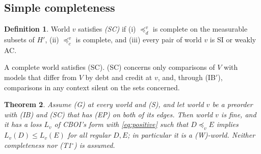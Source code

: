 \documentclass[11pt]{article}
\newtheorem{theorem}{Theorem}
\theoremstyle{definition}\newtheorem{definition}[theorem]{Definition}
\theoremstyle{remark}\newtheorem{remark}[theorem]{Remark}
\newcommand{\To}{\textup{(T1$^\circ$)}}
\begin{document}
\subsection{Simple completeness}\label{sec:SC}

\begin{definition}\label{def:SC}
World $v$ satisfies \emph{(SC)} if (i) $\preceq^v_d$ is complete on the
measurable subsets of $H'$, (ii) $\preceq^v_c$ is complete, and (iii) every
pair of world $v$ is SI or weakly AC.
\end{definition}

A complete world satisfies (SC). (SC) concerns only comparisons of $V$ with
models that differ from $V$ by debt and credit at $v$, and, through (IB$'$),
comparisons in any context silent on the sets concerned.

\begin{theorem}\label{thm:SCext}
Assume (G) at every world and (S), and let world $v$ be a preorder with
(IB) and (SC) that has (EP) on both of its edges. Then world $v$ is fine,
and it has a loss $L_v$ of CBOI's form with \eqref{eq:positive} such that
$D\preceq_vE$ implies $L_v(D)\le L_v(E)$ for all regular $D,E$; in
particular it is a (W)-world. Neither completeness nor \To{} is assumed.
\end{theorem}
\end{document}
